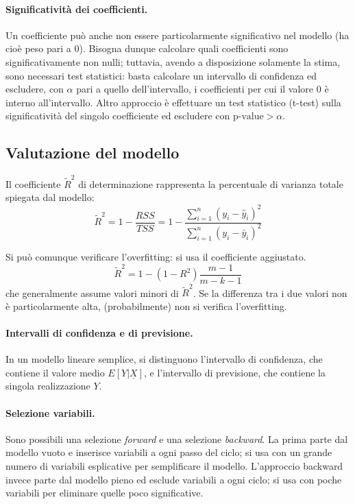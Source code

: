 \documentclass[11pt, a4page, twocolumn]{article}
\begin{document}
\paragraph{Significatività dei coefficienti.}
Un coefficiente può anche non essere particolarmente significativo nel modello (ha cioè peso pari a 0).
Bisogna dunque calcolare quali coefficienti sono significativamente non nulli; tuttavia, avendo a disposizione solamente la stima, sono necessari test statistici: basta calcolare un intervallo di confidenza ed escludere, con $ \alpha$ pari a quello dell'intervallo, i coefficienti per cui il valore 0 è interno all'intervallo.
Altro approccio è effettuare un test statistico (t-test) sulla significatività del singolo coefficiente ed escludere con $\text{p-value} > \alpha$.

\subsection{Valutazione del modello}
Il coefficiente $\tilde{R}^2$ di determinazione rappresenta la percentuale di varianza totale spiegata dal modello:
\begin{equation*}
  \tilde{R}^2 = 1 - \frac{RSS}{TSS} = 1 - \frac{\sum^n_{i=1}{(y_i -
      \hat{y}_i)^2}}{\sum^n_{i=1}{(y_i - \bar{y}_i)^2}}
\end{equation*}

Si può comunque verificare l'overfitting: si usa il coefficiente aggiustato.
\begin{equation*}
  \tilde{R}^2 = 1 - (1 - R^2)\frac{m-1}{m-k-1}
\end{equation*}
che generalmente assume valori minori di $\tilde{R}^2$.
Se la differenza tra i due valori non è particolarmente alta, (probabilmente) non si verifica l'overfitting. \newline

\paragraph{Intervalli di confidenza e di previsione.}
In un modello lineare semplice, si distinguono l'intervallo di confidenza, che contiene il valore medio $E[Y | \underline{X}]$, e l'intervallo di previsione, che contiene la singola realizzazione $Y$.

\paragraph{Selezione variabili.}
Sono possibili una selezione \textit{forward} e una selezione \textit{backward}.
La prima parte dal modello vuoto e inserisce variabili a ogni passo del ciclo; si usa con un grande numero di variabili esplicative per semplificare il modello.
L'approccio backward invece parte dal modello pieno ed esclude variabili a ogni ciclo; si usa con poche variabili per eliminare quelle poco significative.
\end{document}
